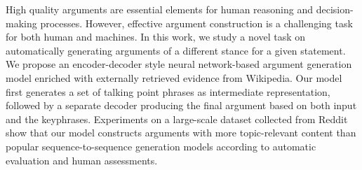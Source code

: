 High quality arguments are essential elements for human reasoning and decision-making processes. However, effective argument construction is a challenging task for both human and machines. In this work, we study a novel task on automatically generating arguments of a different stance for a given statement. We propose an encoder-decoder style neural network-based argument generation model enriched with externally retrieved evidence from Wikipedia. Our model first generates a set of talking point phrases as intermediate representation, followed by a separate decoder producing the final argument based on both input and the keyphrases. Experiments on a large-scale dataset collected from Reddit show that our model constructs arguments with more topic-relevant content than popular sequence-to-sequence generation models according to automatic evaluation and human assessments.
